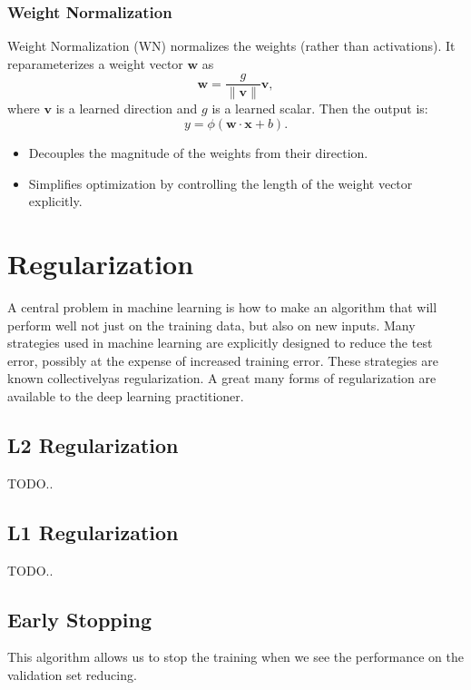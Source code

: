 \documentclass{article}
\begin{document}
\subsubsection{Weight Normalization}
\label{sec:weightnorm}

Weight Normalization (WN) normalizes the weights (rather than activations). It reparameterizes a weight vector $\mathbf{w}$ as
\[
\mathbf{w} = \frac{g}{\|\mathbf{v}\|} \mathbf{v},
\]
where $\mathbf{v}$ is a learned direction and $g$ is a learned scalar. Then the output is:
\[
y = \phi(\mathbf{w} \cdot \mathbf{x} + b).
\]
\begin{itemize}
    \item Decouples the magnitude of the weights from their direction.
    \item Simplifies optimization by controlling the length of the weight vector explicitly.
\end{itemize}

\clearpage\newpage

\section{Regularization} \label{sec:regularization}
A central problem in machine learning is how to make an algorithm that will perform well not just on the training data, but also on new inputs. Many strategies used in machine learning are explicitly designed to reduce the test error, possibly at the expense of increased training error. These strategies are known collectivelyas regularization. A great many forms of regularization are available to the deep learning practitioner.

\subsection{L2 Regularization}
TODO..

\subsection{L1 Regularization}
TODO..

\subsection{Early Stopping}
This algorithm allows us to stop the training when we see the performance on the validation set reducing.
\end{document}
